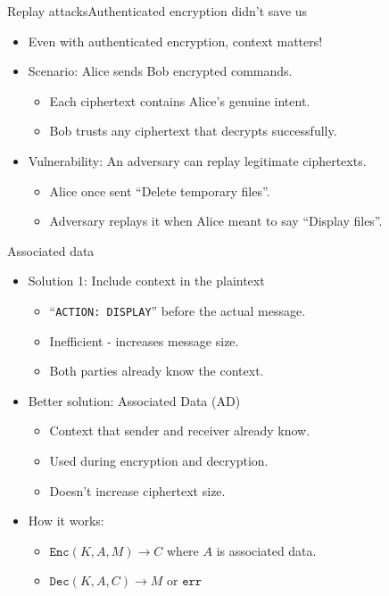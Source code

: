 \documentclass[aspectratio=169, lualatex, handout]{beamer}
\begin{document}
\begin{frame}{Replay attacks}{Authenticated encryption didn't save us}
	\begin{itemize}
		\item Even with authenticated encryption, context matters!
		\item Scenario: Alice sends Bob encrypted commands.
		      \begin{itemize}
			      \item Each ciphertext contains Alice's genuine intent.
			      \item Bob trusts any ciphertext that decrypts successfully.
		      \end{itemize}
		\item Vulnerability: An adversary can replay legitimate ciphertexts.
		      \begin{itemize}
			      \item Alice once sent ``Delete temporary files''.
			      \item Adversary replays it when Alice meant to say ``Display files''.
		      \end{itemize}
	\end{itemize}
\end{frame}

\begin{frame}{Associated data}
	\begin{itemize}
		\item Solution 1: Include context in the plaintext
		      \begin{itemize}
			      \item ``\texttt{ACTION: DISPLAY}'' before the actual message.
			      \item Inefficient - increases message size.
			      \item Both parties already know the context.
		      \end{itemize}
		\item Better solution: Associated Data (AD)
		      \begin{itemize}
			      \item Context that sender and receiver already know.
			      \item Used during encryption and decryption.
			      \item Doesn't increase ciphertext size.
		      \end{itemize}
		\item How it works:
		      \begin{itemize}
			      \item $\texttt{Enc}(K, A, M) \rightarrow C$ where $A$ is associated data.
			      \item $\texttt{Dec}(K, A, C) \rightarrow M$ or $\texttt{err}$
		      \end{itemize}
	\end{itemize}
\end{frame}
\end{document}
